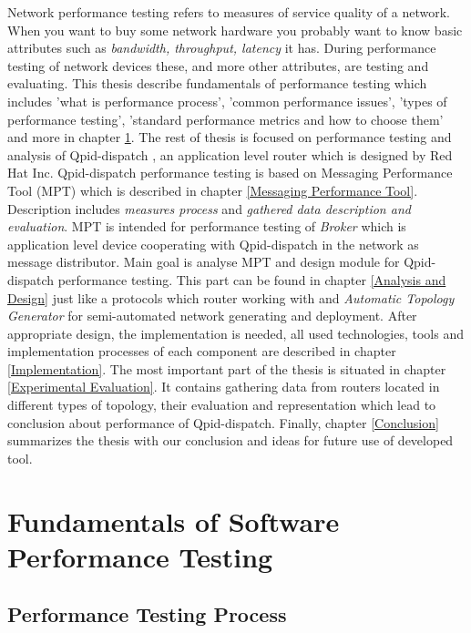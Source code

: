 Network performance testing refers to measures of service quality of a network. When you want to buy some network hardware you probably want to know basic attributes such as \textit{bandwidth, throughput, latency} it has. During performance testing of network devices these, and more other attributes, are testing and evaluating. This thesis describe fundamentals of performance testing which includes 'what is performance process', 'common performance issues', 'types of performance testing', 'standard performance metrics and how to choose them' and more in chapter \ref{Fundamentals of Software Performance Testing}. The rest of thesis is focused on performance testing and analysis of Qpid-dispatch \cite{RH:Interconnect}, an application level router which is designed by Red Hat Inc. Qpid-dispatch performance testing is based on Messaging Performance Tool (MPT)\cite{ORPISKE:MSGPT} which is described in chapter \ref{Messaging Performance Tool}. Description includes \textit{measures process} and \textit{gathered data description and evaluation}. MPT is intended for performance testing of \textit{Broker}\cite{RH:Broker} which is application level device cooperating with Qpid-dispatch in the network as message distributor. Main goal is analyse MPT and design module for Qpid-dispatch performance testing. This part can be found in chapter \ref{Analysis and Design} just like a protocols which router working with and \textit{Automatic Topology Generator} for semi-automated network generating and deployment. After appropriate design, the implementation is needed, all used technologies, tools and  implementation processes of each component are described in chapter \ref{Implementation}. The most important part of the thesis is situated in chapter \ref{Experimental Evaluation}. It contains gathering data from routers located in different types of topology, their evaluation and representation which lead to conclusion about performance of Qpid-dispatch. Finally, chapter \ref{Conclusion} summarizes the thesis with our conclusion  and ideas for future use of developed tool.


\chapter{Fundamentals of Software Performance Testing}
\label{Fundamentals of Software Performance Testing}

\section{Performance Testing Process}
\label{Performance Testing Process}

